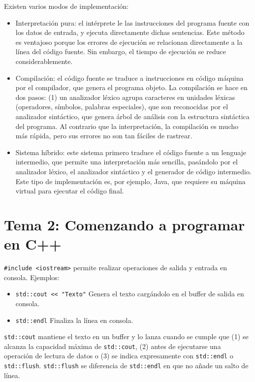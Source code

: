 \documentclass[a4paper]{article}
\begin{document}
	 Existen varios modos de implementación:
	 \begin{itemize}
	 	\item Interpretación pura: el intérprete le las instrucciones del programa fuente con los datos de entrada, y ejecuta directamente dichas sentencias. Este método es ventajoso porque los errores de ejecución se relacionan directamente a la línea del código fuente. Sin embargo, el tiempo de ejecución se reduce considerablemente.
	 	\item Compilación: el código fuente se traduce a instrucciones en código máquina por el compilador, que genera el programa objeto. La compilación se hace en dos pasos: (1) un analizador léxico agrupa caracteres en unidades léxicas (operadores, símbolos, palabras especiales), que son reconocidas por el analizador sintáctico, que genera árbol de análisis con la estructura sintáctica del programa. Al contrario que la interpretación, la compilación es mucho más rápida, pero sus errores no son tan fáciles de rastrear.
	 	\item Sistema híbrido: este sistema primero traduce el código fuente a un lenguaje intermedio, que permite una interpretación más sencilla, pasándolo por el analizador léxico, el analizador sintáctico y el generador de código intermedio. Este tipo de implementación es, por ejemplo, Java, que requiere su máquina virtual para ejecutar el código final.
	 \end{itemize}
	 
	 \section{Tema 2: Comenzando a programar en C++}
	 \verb|#include <iostream>| permite realizar operaciones de salida y entrada en consola.
	 Ejemplos:
	 \begin{itemize}
	 	\item \verb|std::cout << "Texto"| Genera el texto cargándolo en el buffer de salida en consola.
	 	\item \verb|std::endl| Finaliza la línea en consola.
	 	
	 \end{itemize}
 
 	\verb|std::cout| mantiene el texto en un buffer y lo lanza cuando se cumple que (1) se alcanza la capacidad máxima de \verb|std::cout|, (2) antes de ejecutarse una operación de lectura de datos o (3) se indica expresamente con \verb|std::endl| o \verb|std::flush|.  \verb|std::flush|
	  se diferencia de \verb|std::endl| en que no añade un salto de línea.
	  
\end{document}
